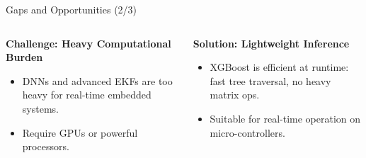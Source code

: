 \documentclass[aspectratio=169,xcolor=dvipsnames]{beamer}
\begin{document}
\begin{frame}{Gaps and Opportunities (2/3)}
\begin{columns}[T]
    \begin{column}{0.48\textwidth}
    \begin{block}{{\textbf{Challenge: Heavy Computational Burden}}}
    \begin{itemize}
        \item DNNs\cite{golroudbari2023cnn6DOF}\cite{CEAS-GNC-2019-036}\cite{brossard2020openloopCNN} and advanced EKFs\cite{EKF}\cite{doubleEKF} are too heavy for real-time embedded systems.
        \item Require GPUs or powerful processors\cite{chen2024dlsurvey}.
    \end{itemize}
    \end{block}
    \end{column}
    
    \begin{column}{0.48\textwidth}
    \begin{exampleblock}{{\textbf{Solution: Lightweight Inference}}}
    \begin{itemize}
        \item XGBoost is efficient at runtime: fast tree traversal, no heavy matrix ops.
        \item Suitable for real-time operation on micro-controllers.
    \end{itemize}
    \end{exampleblock}
    \end{column}
\end{columns}
\end{frame}
\end{document}
